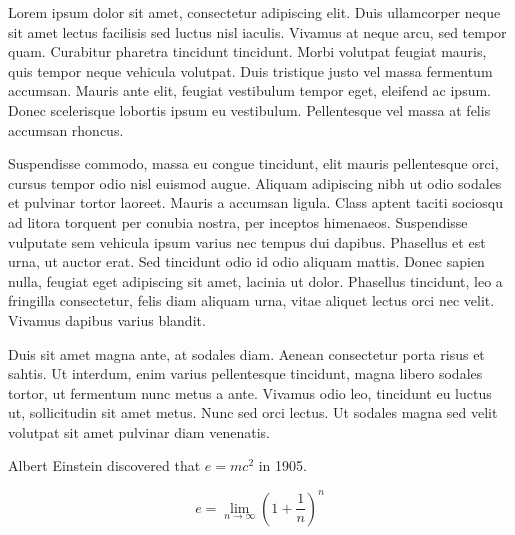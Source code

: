 \documentclass[10pt,a4paper]{moderncv}        %
\begin{document}
Lorem ipsum dolor sit amet, consectetur adipiscing elit. Duis ullamcorper neque sit amet lectus facilisis sed luctus nisl iaculis. Vivamus at neque arcu, sed tempor quam. Curabitur pharetra tincidunt tincidunt. Morbi volutpat feugiat mauris, quis tempor neque vehicula volutpat. Duis tristique justo vel massa fermentum accumsan. Mauris ante elit, feugiat vestibulum tempor eget, eleifend ac ipsum. Donec scelerisque lobortis ipsum eu vestibulum. Pellentesque vel massa at felis accumsan rhoncus.

Suspendisse commodo, massa eu congue tincidunt, elit mauris pellentesque orci, cursus tempor odio nisl euismod augue. Aliquam adipiscing nibh ut odio sodales et pulvinar tortor laoreet. Mauris a accumsan ligula. Class aptent taciti sociosqu ad litora torquent per conubia nostra, per inceptos himenaeos. Suspendisse vulputate sem vehicula ipsum varius nec tempus dui dapibus. Phasellus et est urna, ut auctor erat. Sed tincidunt odio id odio aliquam mattis. Donec sapien nulla, feugiat eget adipiscing sit amet, lacinia ut dolor. Phasellus tincidunt, leo a fringilla consectetur, felis diam aliquam urna, vitae aliquet lectus orci nec velit. Vivamus dapibus varius blandit.

Duis sit amet magna ante, at sodales diam. Aenean consectetur porta risus et sahtis. Ut interdum, enim varius pellentesque tincidunt, magna libero sodales tortor, ut fermentum nunc metus a ante. Vivamus odio leo, tincidunt eu luctus ut, sollicitudin sit amet metus. Nunc sed orci lectus. Ut sodales magna sed velit volutpat sit amet pulvinar diam venenatis.

Albert Einstein discovered that $e=mc^2$ in 1905.

\[ e=\lim_{n \to \infty} \left(1+\frac{1}{n}\right)^n \]

\makeletterclosing

\end{document}
